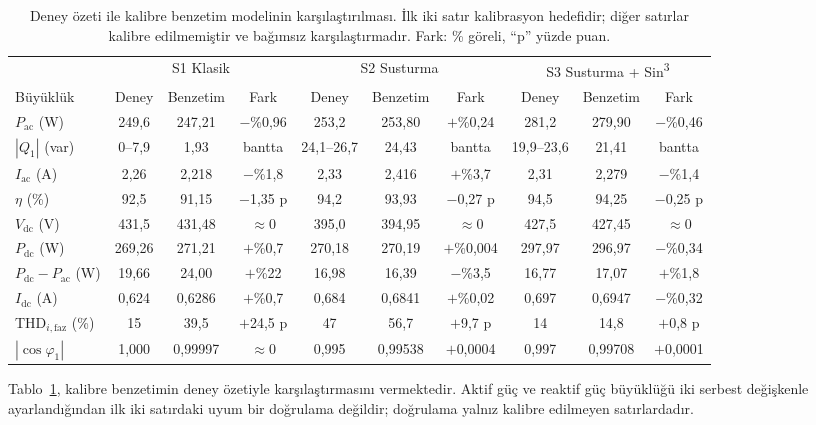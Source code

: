 \begin{table}[htbp]
  \centering
  \caption{Deney özeti ile kalibre benzetim modelinin karşılaştırılması. İlk iki satır kalibrasyon hedefidir; diğer satırlar kalibre edilmemiştir ve bağımsız karşılaştırmadır. Fark: \% göreli, ``p'' yüzde puan.}
  \label{tab:kalibrasyon-karsilastirma}
  \scriptsize
  \setlength{\tabcolsep}{2.6pt}
  \begin{tabular}{@{}l ccc ccc ccc@{}}
    \toprule
    & \multicolumn{3}{c}{S1 Klasik} & \multicolumn{3}{c}{S2 Susturma} & \multicolumn{3}{c}{S3 Susturma + Sin\textsuperscript{3}} \\
    \cmidrule(lr){2-4}\cmidrule(lr){5-7}\cmidrule(lr){8-10}
    Büyüklük & Deney & Benzetim & Fark & Deney & Benzetim & Fark & Deney & Benzetim & Fark \\
    \midrule
    $P_{\mathrm{ac}}$ (W) & 249,6 & 247,21 & $-$\%0,96 & 253,2 & 253,80 & $+$\%0,24 & 281,2 & 279,90 & $-$\%0,46 \\
    $|Q_1|$ (var) & 0--7,9 & 1,93 & bantta & 24,1--26,7 & 24,43 & bantta & 19,9--23,6 & 21,41 & bantta \\
    \midrule
    $I_{\mathrm{ac}}$ (A) & 2,26 & 2,218 & $-$\%1,8 & 2,33 & 2,416 & $+$\%3,7 & 2,31 & 2,279 & $-$\%1,4 \\
    $\eta$ (\%) & 92,5 & 91,15 & $-$1,35 p & 94,2 & 93,93 & $-$0,27 p & 94,5 & 94,25 & $-$0,25 p \\
    $V_{\mathrm{dc}}$ (V) & 431,5 & 431,48 & $\approx0$ & 395,0 & 394,95 & $\approx0$ & 427,5 & 427,45 & $\approx0$ \\
    $P_{\mathrm{dc}}$ (W) & 269,26 & 271,21 & $+$\%0,7 & 270,18 & 270,19 & $+$\%0,004 & 297,97 & 296,97 & $-$\%0,34 \\
    $P_{\mathrm{dc}}-P_{\mathrm{ac}}$ (W) & 19,66 & 24,00 & $+$\%22 & 16,98 & 16,39 & $-$\%3,5 & 16,77 & 17,07 & $+$\%1,8 \\
    $I_{\mathrm{dc}}$ (A) & 0,624 & 0,6286 & $+$\%0,7 & 0,684 & 0,6841 & $+$\%0,02 & 0,697 & 0,6947 & $-$\%0,32 \\
    THD$_{i,\mathrm{faz}}$ (\%) & 15 & 39,5 & $+$24,5 p & 47 & 56,7 & $+$9,7 p & 14 & 14,8 & $+$0,8 p \\
    $|\cos\varphi_1|$ & 1,000 & 0,99997 & $\approx0$ & 0,995 & 0,99538 & $+$0,0004 & 0,997 & 0,99708 & $+$0,0001 \\
    \bottomrule
  \end{tabular}
\end{table}

Tablo~\ref{tab:kalibrasyon-karsilastirma}, kalibre benzetimin deney özetiyle karşılaştırmasını vermektedir. Aktif güç ve reaktif güç büyüklüğü iki serbest değişkenle ayarlandığından ilk iki satırdaki uyum bir doğrulama değildir; doğrulama yalnız kalibre edilmeyen satırlardadır.

